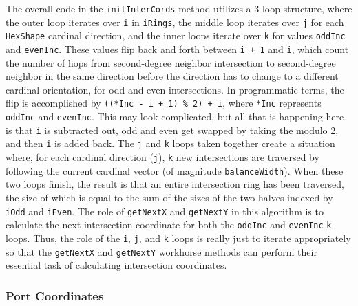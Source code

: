 \documentclass[pageno]{jpaper}
\begin{document}
\begin{doublespacing}
The overall code in the \lstinline$initInterCords$ method utilizes a 3-loop structure, where the outer loop iterates over \lstinline$i$ in \lstinline$iRings$, the middle loop iterates over \lstinline$j$ for each \lstinline$HexShape$ cardinal direction, and the inner loops iterate over \lstinline$k$ for values \lstinline$oddInc$ and \lstinline$evenInc$. These values flip back and forth between \lstinline$i + 1$ and \lstinline$i$, which count the number of hops from second-degree neighbor intersection to second-degree neighbor in the same direction before the direction has to change to a different cardinal orientation, for odd and even intersections. In programmatic terms, the flip is accomplished by \lstinline$((*Inc - i + 1) % 2) + i$, where \lstinline$*Inc$ represents \lstinline$oddInc$ and \lstinline$evenInc$. This may look complicated, but all that is happening here is that \lstinline$i$ is subtracted out, odd and even get swapped by taking the modulo 2, and then \lstinline$i$ is added back. The \lstinline$j$ and \lstinline$k$ loops taken together create a situation where, for each cardinal direction (\lstinline$j$), \lstinline$k$ new intersections are traversed by following the current cardinal vector (of magnitude \lstinline$balanceWidth$). When these two loops finish, the result is that an entire intersection ring has been traversed, the size of which is equal to the sum of the sizes of the two halves indexed by \lstinline$iOdd$ and \lstinline$iEven$. The role of \lstinline$getNextX$ and \lstinline$getNextY$ in this algorithm is to calculate the next intersection coordinate for both the \lstinline$oddInc$ and \lstinline$evenInc$ \lstinline$k$ loops. Thus, the role of the \lstinline$i$, \lstinline$j$, and \lstinline$k$ loops is really just to iterate appropriately so that the \lstinline$getNextX$ and \lstinline$getNextY$ workhorse methods can perform their essential task of calculating intersection coordinates.

\hypertarget{sec:port_coordinates}{}
\subsubsection{Port Coordinates}


\end{doublespacing}
\end{document}
